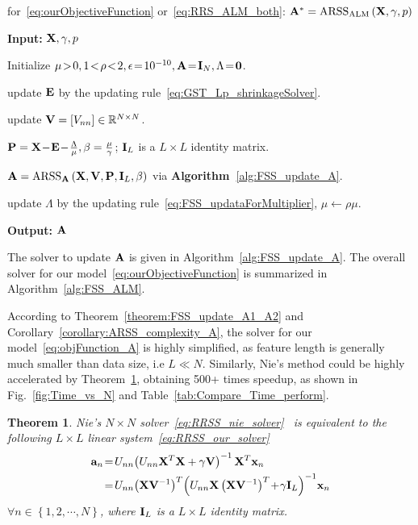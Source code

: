 \documentclass[a4paper]{article}
\newtheorem{theorem}{Theorem}  %
\begin{document}
\begin{algorithm}[t]
\caption{for\ \eqref{eq:ourObjectiveFunction} or\ \eqref{eq:RRS_ALM_both}:
$\mathbf{A}^{*}=\text{ARSS}_{\text{ALM}}\left(\mathbf{X},\gamma,p\right)$\textbf{\label{alg:FSS_ALM}}}
 \textbf{Input:} $\mathbf{X},\gamma,p$

\begin{algorithmic}[1] 

\STATE Initialize\emph{ }$\mu\!>\!0,1\!<\!\rho\!<\!2,\epsilon\!=\!10^{-10},\mtbfA\!=\!\mtbfI_{N},\Lambda\!=\!\mtbfzero$.

\REPEAT

\STATE update $\mathbf{E}$ by the updating rule~\eqref{eq:GST_Lp_shrinkageSolver}.

\STATE update $\mathbf{V}=\left[V_{nn}\right]\in\mathbb{R}^{N\times N}$.

\STATE $\mathbf{P}=\mathbf{X}\!-\!\mathbf{E}\!-\!\frac{\Lambda}{\mu},\beta=\frac{\mu}{\gamma}$;
$\mathbf{I}_{L}$ is a $L\times L$ identity matrix.

\STATE $\mathbf{A}=\text{ARSS}_{\mathbf{A}}\left(\mathbf{X},\mathbf{V},\mathbf{P},\mathbf{I}_{L},\beta\right)$
via \textbf{Algorithm\ }\ref{alg:FSS_update_A}.

\STATE update $\Lambda$ by the updating rule~\eqref{eq:FSS_updataForMultiplier},
$\mu\leftarrow\rho\mu$.


\end{algorithmic} 

\textbf{Output:} $\mathbf{A}$ 
\end{algorithm}
 

The solver to update $\mathbf{A}$ is given in Algorithm\ \ref{alg:FSS_update_A}.
The overall solver for our model\ \eqref{eq:ourObjectiveFunction}
is summarized in Algorithm\ \ref{alg:FSS_ALM}. 

According to Theorem\ \ref{theorem:FSS_update_A1_A2} and Corollary\ \ref{corollary:ARSS_complexity_A},
the solver  for our model\ \eqref{eq:objFunction_A} is highly simplified,
as feature length is generally much smaller than data size, i.e $L\!\ll\! N$.
Similarly, Nie's method could be highly accelerated by Theorem\ \ref{theorem:RRSS_nie2our},
obtaining 500+ times speedup, as shown in Fig.\ \ref{fig:Time_vs_N}
and Table\ \ref{tab:Compare_Time_perform}.

\begin{theorem} \label{theorem:RRSS_nie2our} Nie's $N\times N$
solver\ \eqref{eq:RRSS_nie_solver}\ \cite{FpNie_2013_IJCAI_EarlyActiveLearning}
is equivalent to the following $L\times L$ linear system\ \eqref{eq:RRSS_our_solver}
\begin{align}
\mtbfa_{n}\! & =\! U_{nn}\!\left(U_{nn}\mtbfX^{T}\mtbfX+\gamma\mtbfV\right)^{-1}\mtbfX^{T}\mtbfx_{n}\label{eq:RRSS_nie_solver}\\
 & =\! U_{nn}\!\left(\mtbfX\mtbfV^{-1}\right)^{T}\!\left(U_{nn}\mtbfX\left(\mtbfX\mtbfV^{-1}\right)^{T}\!+\!\gamma\mtbfI_{L}\right)^{-1}\!\mtbfx_{n}\label{eq:RRSS_our_solver}
\end{align}
$\forall n\in\left\{ 1,2,\cdots,N\right\} $, where $\mathbf{I}_{L}$
is a $L\times L$ identity matrix.\end{theorem}
\end{document}
